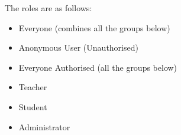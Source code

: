 \documentclass[a4paper,11pt,twoside]{report}
\theoremstyle{definition}
\begin{document}
The roles are as follows:
\begin{itemize}
\itemsep0em 
\addtolength{\itemindent}{0.5cm}
    \vspace{-0.2cm}\item Everyone (combines all the groups below)
    \vspace{-0.2cm}\item Anonymous User (Unauthorised)
	  \vspace{-0.2cm}\item Everyone Authorised (all the groups below)
    \vspace{-0.2cm}\item Teacher
    \vspace{-0.2cm}\item Student
    \vspace{-0.2cm}\item Administrator
\end{itemize}
\end{document}
